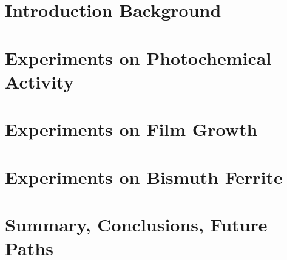 \documentclass[	12pt,%
				twoside,%
				letterpaper]{uiothesis}
\author{Andrew M. Schultz}
\begin{document}


\pagestyle{uio}


\frontmatter

	
	\maketitle
	\cleardoublepage

	
	
	\cleardoublepage
	
	
	\cleardoublepage
	
	\tableofcontents
	\cleardoublepage
	
	\listoffigures
	\cleardoublepage

	\listoftables
	\cleardoublepage

	
	\cleardoublepage


\mainmatter

	\part{Introduction \oldand Background}
		
		
		

	\part{Experiments on Photochemical Activity}
		
		
		

	\part{Experiments on Film Growth}
		
		

	\part{Experiments on Bismuth Ferrite}	
			

	\part{Summary, Conclusions, \oldand Future Paths}
		 



	
	\renewcommand{\bibname}{References}
	
	


	\appendixpage*

	\begin{appendices}
		
	\end{appendices}
	\cleardoublepage
	
	\makecolophon
\end{document}
